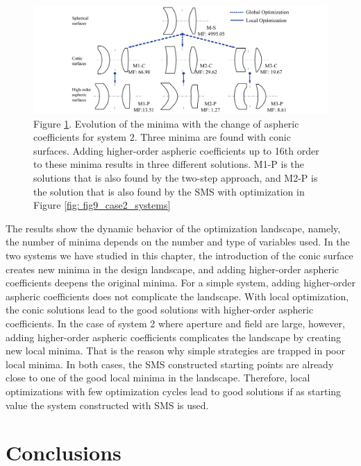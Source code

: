 \begin{figure}[h!]
    \centering
    \includegraphics[width=1\textwidth]{chapter-5/figures/Fig13_OE340147.png}
    \caption{Figure \ref{fig: fig13_case2_optStruc}. Evolution of the minima with the change of aspheric coefficients for system 2. Three minima are found with conic surfaces. Adding higher-order aspheric coefficients up to 16th order to these minima results in three different solutions. M1-P is the solutions that is also found by the two-step approach, and M2-P is the solution that is also found by the SMS with optimization in Figure \ref{fig: fig9_case2_systems}}
    \label{fig: fig13_case2_optStruc}
\end{figure}

The results show the dynamic behavior of the optimization landscape, namely, the number of minima depends on the number and type of variables used. In the two systems we have studied in this chapter, the introduction of the conic surface creates new minima in the design landscape, and adding higher-order aspheric coefficients deepens the original minima. For a simple system, adding higher-order aspheric coefficients does not complicate the landscape. With local optimization, the conic solutions lead to the good solutions with higher-order aspheric coefficients. In the case of system 2 where aperture and field are large, however, adding higher-order aspheric coefficients complicates the landscape by creating new local minima. That is the reason why simple strategies are trapped in poor local minima. In both cases, the SMS constructed starting points are already close to one of the good local minima in the landscape. Therefore, local optimizations with few optimization cycles lead to good solutions if as starting value the system constructed with SMS is used.

\section{Conclusions}

